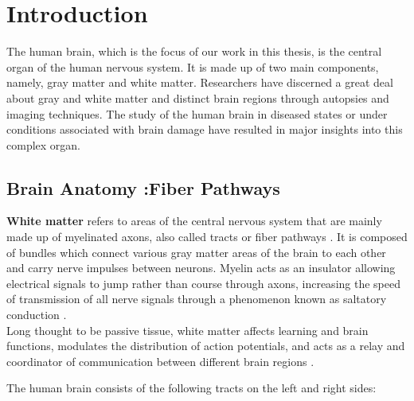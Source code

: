 \documentclass[../structure.tex]{subfiles}
\begin{document}
\chapter{Introduction}

	The human brain, which is the focus of our work in this thesis, is the central organ of the human nervous system. It is made up of two main components, namely, gray 	     			    matter and white matter. Researchers have discerned a great deal about gray and white matter and distinct brain regions through autopsies and imaging techniques. The study 		of the human brain in diseased states or under conditions associated with brain damage have resulted in major insights into this complex organ.

\section{Brain Anatomy :Fiber Pathways}

	 \textbf{White matter} refers to areas of the central nervous system that are mainly made up of myelinated axons, also called tracts or fiber pathways \cite{Blumenfeld2010}. It is composed of bundles which connect various gray matter areas of the brain to each other and carry nerve impulses between neurons. Myelin acts as an insulator allowing electrical signals to jump rather than course through axons, increasing the speed of transmission of all nerve signals through a phenomenon known as saltatory conduction \cite{Klein2008}.
	\\Long thought to be passive tissue, white matter affects learning and brain functions, modulates the distribution of action potentials, and acts as a relay and coordinator of communication between different brain regions \cite{Fields2008}.
	
	The human brain consists of the following tracts on the left and right sides:
	\begin{comment}
   \begin{itemize}
       \item Anterior Thalamic Radiation (ATR)
       \item Corpus Callosum (CC)
       \item Genu of the Corpus Callosum (genu)
       \item Splenium of the Corpus Callosum (splenium)
       \item Body of Corpus Callosum (truncus)
		\item Cingulum (Cing)
		\item Corticospinal Tract (CST)
		\item Inferior Fronto-occipital Fasciculus (IFO)
		\item Inferior Longitudinal Fasciculus (ILF)
		\item Superior Longitudinal Fasciculus (SLF)
		\item Ventral Tegmental Area (VTA)
	\end{itemize}
	\end{comment}
\end{document}
